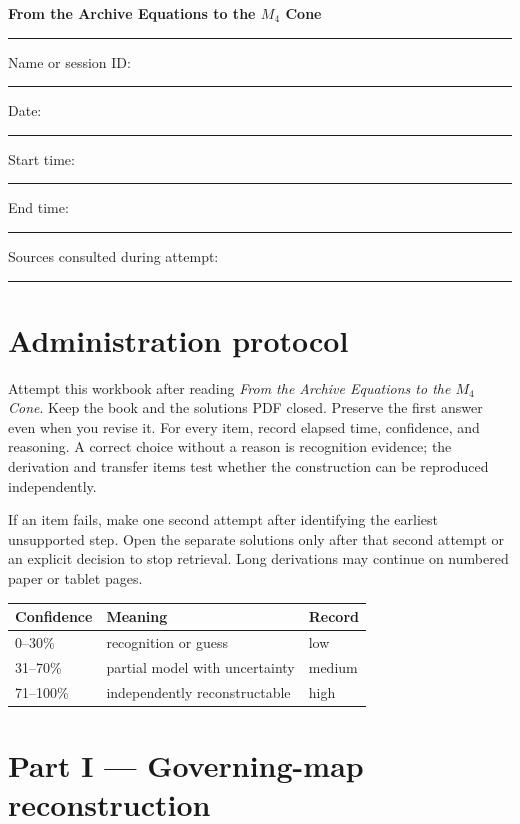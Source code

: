 \documentclass[11pt,letterpaper]{article}
\begin{document}
\begin{center}
{\color{navy}\LARGE\bfseries From the Archive Equations to the $M_4$ Cone}\par
\vspace{3pt}{\Large Closed-Book Reconstruction and Problem Workbook}\par
\vspace{3pt}{\small Post-Reading Mastery Quiz (Exit Quiz) and Transfer-and-Repair Work}
\end{center}
\hrule\vspace{8pt}

Name or session ID: \rule{0.35\textwidth}{0.4pt}\hfill
Date: \rule{0.22\textwidth}{0.4pt}

Start time: \rule{0.18\textwidth}{0.4pt}\hfill
End time: \rule{0.18\textwidth}{0.4pt}\hfill
Sources consulted during attempt: \rule{0.22\textwidth}{0.4pt}

\section*{Administration protocol}

Attempt this workbook after reading
\emph{From the Archive Equations to the $M_4$ Cone}.  Keep the book and the
solutions PDF closed.  Preserve the first answer even when you revise it.
For every item, record elapsed time, confidence, and reasoning.  A correct
choice without a reason is recognition evidence; the derivation and transfer
items test whether the construction can be reproduced independently.

If an item fails, make one second attempt after identifying the earliest
unsupported step.  Open the separate solutions only after that second attempt
or an explicit decision to stop retrieval.  Long derivations may continue on
numbered paper or tablet pages.

\begin{center}
\begin{tabular}{@{}lll@{}}
\toprule
Confidence & Meaning & Record\\
\midrule
0--30\% & recognition or guess & low\\
31--70\% & partial model with uncertainty & medium\\
71--100\% & independently reconstructable & high\\
\bottomrule
\end{tabular}
\end{center}

\section*{Part I --- Governing-map reconstruction}
\end{document}
